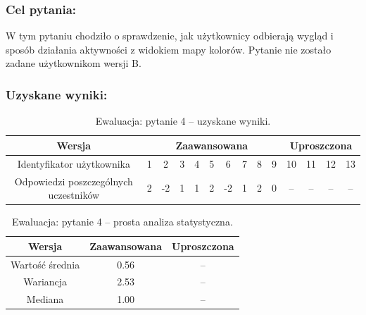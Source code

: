 	\subsubsection{Cel pytania:}
	
	W tym pytaniu chodziło o sprawdzenie, jak użytkownicy odbierają wygląd i sposób działania aktywności z widokiem mapy kolorów. Pytanie nie zostało zadane użytkownikom wersji B.
	
	\subsubsection{Uzyskane wyniki:}
	
	\begin{table}[!h]
		\caption{Ewaluacja: pytanie 4 -- uzyskane wyniki.}
		\centering
		\begin{tabular}{|c|c|c|c|c|c|c|c|c|c|c|c|c|c|}
			\hline
			Wersja &  \multicolumn{9}{c|}{Zaawansowana} & \multicolumn{4}{c|}{Uproszczona}\\ \hline
			Identyfikator użytkownika             & 1 & 2 & 3 & 4 & 5 & 6 & 7 & 8 & 9 
			& 10 & 11 & 12 & 13 \\ \hline
			Odpowiedzi poszczególnych uczestników & 2 & -2 & 1 & 1 & 2 & -2 & 1 & 2 & 0
			& --  & -- & -- & --     \\ \hline
		\end{tabular}
	\end{table}
	
	\begin{table}[!h]
		\caption{Ewaluacja: pytanie 4 -- prosta analiza statystyczna.}
		\centering
		\begin{tabular}{|c|c|c|}
			\hline
			Wersja          & Zaawansowana & Uproszczona \\ \hline
			Wartość średnia & 0.56         & --          \\ \hline
			Wariancja       & 2.53         & --          \\ \hline
			Mediana         & 1.00         & --          \\ \hline
		\end{tabular}
	\end{table}
	
